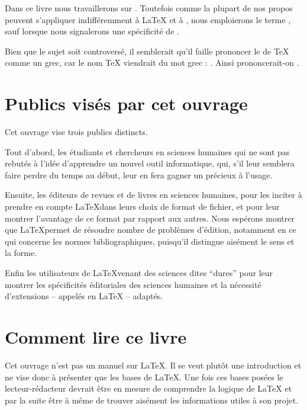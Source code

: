 Dans  ce livre nous travaillerons sur \XeLaTeX{}. Toutefois comme la plupart de nos propos peuvent s'appliquer indifféremment  à \LaTeX{} et à \XeLaTeX{}, nous emploierons
le terme \forme{\LaTeX{}}, sauf lorsque nous signalerons une spécificité de \XeLaTeX{}.

\begin{plusloins}
Bien que le sujet soit controversé, il semblerait qu'il faille prononcer le   de \TeX{} comme un  grec, car le nom \TeX{} viendrait du mot grec  : . Ainsi prononcerait-on .
\end{plusloins}


\section{Publics visés par cet ouvrage}

Cet ouvrage vise  trois publics distincts.

Tout d'abord, les étudiants et chercheurs en sciences humaines qui ne sont pas rebutés à l'idée d'apprendre un nouvel outil informatique, qui, s'il leur semblera faire perdre du temps au début, leur en fera gagner un précieux  à l'usage.

Ensuite, les éditeurs de revues et de livres en sciences humaines, pour les inciter à prendre en compte \LaTeX dans leurs choix de format de fichier, et pour leur montrer l'avantage de ce format par rapport aux autres. Nous espérons montrer que \LaTeX permet de résoudre nombre de problèmes d'édition, notamment en ce qui concerne les normes bibliographiques, puisqu'il distingue aisément le sens et la forme.

Enfin les utilisateurs de \LaTeX venant des sciences dites \enquote{dures} pour leur montrer les spécificités éditoriales des sciences humaines et la nécessité d'extensions -- appelés  en \LaTeX{} -- adaptés.


\section{Comment lire ce livre}

Cet ouvrage n'est pas un manuel sur \LaTeX{}. Il se veut plutôt une introduction et ne vise donc à présenter que les bases de \LaTeX{}. Une fois ces bases posées le lecteur-rédacteur devrait être en mesure de comprendre la logique de \LaTeX{} et par la suite être à même de trouver aisément les informations utiles à son projet.

